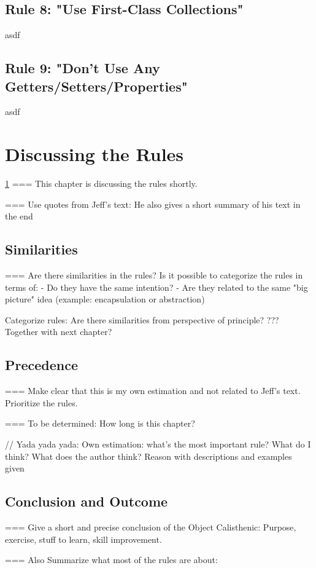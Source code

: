 \subsection{Rule 8: "Use First-Class Collections"}
asdf
\subsection{Rule 9: "Don’t Use Any Getters/Setters/Properties"}
asdf
\section{Discussing the Rules}
\label{d:discussion}
\ref{d:discussion}
=== This chapter is discussing the rules shortly. 

=== Use quotes from Jeff's text: He also gives a short summary of his text in the end

\subsection{Similarities}
=== Are there similarities in the rules? Is it possible to categorize the rules in terms of: 
 - Do they have the same intention?
 - Are they related to the same "big picture" idea (example: encapsulation or abstraction) 

Categorize rules: Are there similarities from perspective of principle? ??? Together with next chapter?

\subsection{Precedence}
=== Make clear that this is my own estimation and not related to Jeff's text. Prioritize the rules. 

=== To be determined: How long is this chapter?

\begin{itshape}
// Yada yada yada: 
Own estimation: what's the most important rule? 
What do I think?
What does the author think? 
Reason with descriptions and examples given
\end{itshape}

\subsection{Conclusion and Outcome}
=== Give a short and precise conclusion of the Object Calisthenic: Purpose, exercise, stuff to learn, skill improvement. 

=== Also Summarize what most of the rules are about: 

